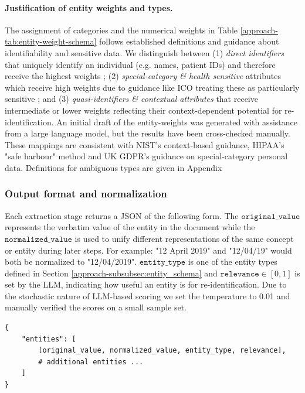 \paragraph{Justification of entity weights and types.}
The assignment of categories and the numerical weights in Table \ref{approach-tab:entity-weight-schema} follows established definitions and guidance about identifiability and sensitive data. We distinguish between (1) \textit{direct identifiers} that uniquely identify an individual (e.g. names, patient IDs) and therefore receive the highest weights \cite{NIST_privacy_recommendation,HIPAA_priacy_recommendation}; (2) \textit{special-category \& health sensitive} attributes which receive high weights due to guidance like ICO treating these as particularly sensitive \cite{ICO_special_category}; and (3) \textit{quasi-identifiers \& contextual attributes} that receive intermediate or lower weights reflecting their context-dependent potential for re-identification. An initial draft of the entity-weights was generated with assistance from a large language model, but the results have been cross-checked manually. These mappings are consistent with NIST's context-based guidance, HIPAA's "safe harbour" method  and UK GDPR's guidance on special-category personal data.  Definitions for ambiguous types are given in Appendix %
  
\subsubsection{Output format and normalization}
Each extraction stage returns a JSON of the following form. The $\texttt{original\_value}$ represents the verbatim value of the entity in the document while the $\texttt{normalized\_value}$ is used to unify different representations of the same concept or entity during later steps. For example: "12 April 2019" and "12/04/19" would both be normalized to "12/04/2019". $\texttt{entity\_type}$ is one of the entity types defined in Section \ref{approach-subsubsec:entity_schema} and $\texttt{relevance}\in[0,1]$ is set by the LLM, indicating how useful an entity is for re-identification. Due to the stochastic nature of LLM-based scoring we set the temperature to 0.01 and manually verified the scores on a small sample set.

\begin{lstlisting}[caption={Response JSON schema},label={approach-lst:entity-output-schema}]
{
    "entities": [
        [original_value, normalized_value, entity_type, relevance],
        # additional entities ...
    ]
}
\end{lstlisting}

